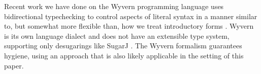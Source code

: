 \documentclass[9pt,preprint]{sigplanconf}
\newcommand{\myrowcolour}{\rowcolor[gray]{0.925}}
\begin{document}
Recent work we have done on the Wyvern programming language uses bidirectional typechecking to control aspects of literal syntax in a manner similar to, but somewhat more flexible than, how we treat introductory forms \cite{TSLs}. Wyvern is its own language dialect and does not have an extensible type system, supporting only desugarings like SugarJ \cite{erdweg2011sugarj}. The Wyvern formalism guarantees hygiene, using an approach that is also likely applicable in the setting of this paper.
%
%
%
%
%
%
%
\end{document}
